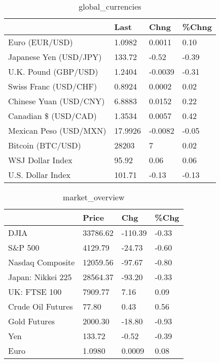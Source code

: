 \documentclass{article}%
\begin{document}
%


\begin{table}[htbp]%
\caption{global\_currencies}%
\centering%
\begin{adjustbox}{width=1\textwidth}%
\begin{tabular}{llll}
\toprule
                       &    Last &    Chng & \%Chng \\
\midrule
        Euro (EUR/USD) &  1.0982 &  0.0011 &  0.10 \\
Japanese Yen (USD/JPY) &  133.72 &   -0.52 & -0.39 \\
  U.K. Pound (GBP/USD) &  1.2404 & -0.0039 & -0.31 \\
 Swiss Franc (USD/CHF) &  0.8924 &  0.0002 &  0.02 \\
Chinese Yuan (USD/CNY) &  6.8883 &  0.0152 &  0.22 \\
  Canadian \$ (USD/CAD) &  1.3534 &  0.0057 &  0.42 \\
Mexican Peso (USD/MXN) & 17.9926 & -0.0082 & -0.05 \\
     Bitcoin (BTC/USD) &   28203 &       7 &  0.02 \\
      WSJ Dollar Index &   95.92 &    0.06 &  0.06 \\
     U.S. Dollar Index &  101.71 &   -0.13 & -0.13 \\
\bottomrule
\end{tabular}
%
\end{adjustbox}%
\end{table}

%


\begin{table}[htbp]%
\caption{market\_overview}%
\centering%
\begin{adjustbox}{width=1\textwidth}%
\begin{tabular}{llll}
\toprule
                  &    Price &     Chg &  \%Chg \\
\midrule
             DJIA & 33786.62 & -110.39 & -0.33 \\
          S\&P 500 &  4129.79 &  -24.73 & -0.60 \\
 Nasdaq Composite & 12059.56 &  -97.67 & -0.80 \\
Japan: Nikkei 225 & 28564.37 &  -93.20 & -0.33 \\
     UK: FTSE 100 &  7909.77 &    7.16 &  0.09 \\
Crude Oil Futures &    77.80 &    0.43 &  0.56 \\
     Gold Futures &  2000.30 &  -18.80 & -0.93 \\
              Yen &   133.72 &   -0.52 & -0.39 \\
             Euro &   1.0980 &  0.0009 &  0.08 \\
\bottomrule
\end{tabular}
%
\end{adjustbox}%
\end{table}

%
\end{document}
